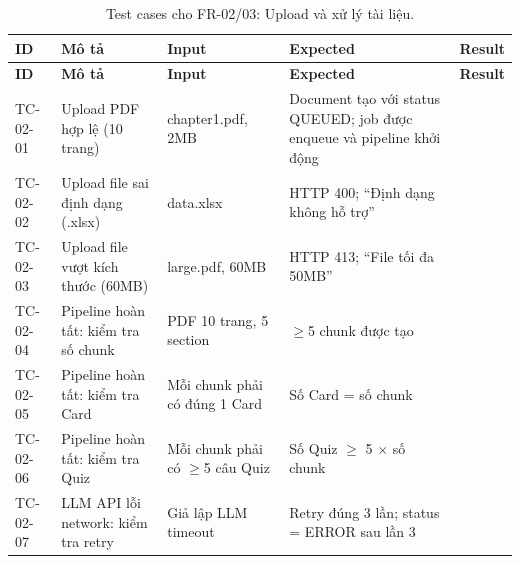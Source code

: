 \begin{longtable}{|p{1.5cm}|p{4.5cm}|p{3.5cm}|p{3cm}|p{2cm}|}
    \caption{Test cases cho FR-02/03: Upload và xử lý tài liệu.} \label{tab:tc-fr02} \\
    \hline
    \textbf{ID} & \textbf{Mô tả} & \textbf{Input} & \textbf{Expected} & \textbf{Result} \\
    \hline
    \endfirsthead \hline
    \textbf{ID} & \textbf{Mô tả} & \textbf{Input} & \textbf{Expected} & \textbf{Result} \\
    \hline \endhead

    TC-02-01 & Upload PDF hợp lệ (10 trang) &
        chapter1.pdf, 2MB &
        Document tạo với status QUEUED; job được enqueue và pipeline khởi động & \\ \hline

    TC-02-02 & Upload file sai định dạng (.xlsx) &
        data.xlsx &
        HTTP 400; ``Định dạng không hỗ trợ'' & \\ \hline

    TC-02-03 & Upload file vượt kích thước (60MB) &
        large.pdf, 60MB &
        HTTP 413; ``File tối đa 50MB'' & \\ \hline

    TC-02-04 & Pipeline hoàn tất: kiểm tra số chunk &
        PDF 10 trang, 5 section &
        $\geq$5 chunk được tạo & \\ \hline

    TC-02-05 & Pipeline hoàn tất: kiểm tra Card &
        Mỗi chunk phải có đúng 1 Card &
        Số Card = số chunk & \\ \hline

    TC-02-06 & Pipeline hoàn tất: kiểm tra Quiz &
        Mỗi chunk phải có $\geq$5 câu Quiz &
        Số Quiz $\geq$ 5 $\times$ số chunk & \\ \hline

    TC-02-07 & LLM API lỗi network: kiểm tra retry &
        Giả lập LLM timeout &
        Retry đúng 3 lần; status = ERROR sau lần 3 & \\ \hline
\end{longtable}

